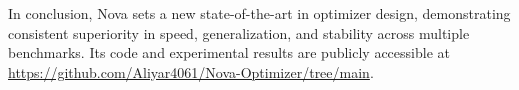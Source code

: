 \documentclass[10pt,twocolumn]{article}
\begin{document}
In conclusion, Nova sets a new state-of-the-art in optimizer design, demonstrating consistent superiority in speed, generalization, and stability across multiple benchmarks. Its code and experimental results are publicly accessible at \url{https://github.com/Aliyar4061/Nova-Optimizer/tree/main}.
%
%
%
%
\end{document}
